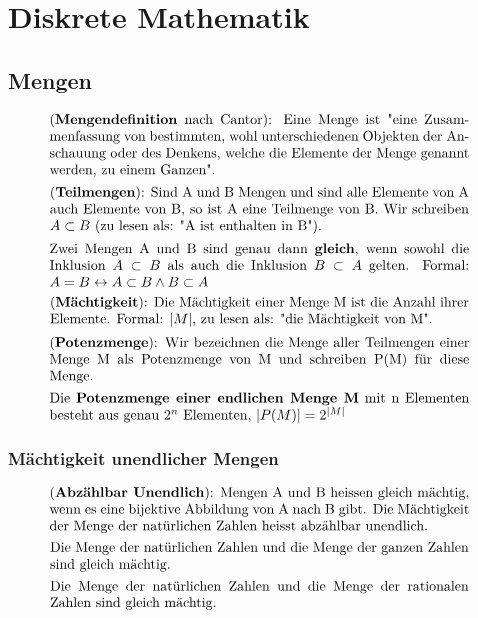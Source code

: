 \chapter{Diskrete Mathematik}
\section{Mengen}

\begin{equation}
    \parbox{30em}{(\textbf{Mengendefinition} nach Cantor): Eine Menge ist "eine Zusammenfassung von bestimmten, wohl unterschiedenen Objekten der Anschauung oder 
    des Denkens, welche die Elemente der Menge genannt werden, zu einem Ganzen".}
\end{equation}
\begin{equation}
    \parbox{30em}{(\textbf{Teilmengen}): Sind A und B Mengen und sind alle Elemente von A
    auch Elemente von B, so ist A eine Teilmenge von B. Wir schreiben \( A \subset B \) (zu 
    lesen als: "A ist enthalten in B").}
\end{equation}
\begin{equation}
    \parbox{30em}{Zwei Mengen A und B sind genau dann \textbf{gleich}, wenn sowohl die Inklusion 
    \(A \subset B\) als auch die Inklusion \( B \subset A\) gelten. 
    Formal: \(A = B \leftrightarrow A \subset B \land B \subset A\)}
\end{equation}
\begin{equation}
    \parbox{30em}{(\textbf{Mächtigkeit}): Die Mächtigkeit einer Menge M ist die Anzahl ihrer 
    Elemente. Formal: \(|M|\), zu lesen als: "die Mächtigkeit von M".}
\end{equation}
\begin{equation}
    \parbox{30em}{(\textbf{Potenzmenge}): Wir bezeichnen die Menge aller Teilmengen einer 
    Menge M als Potenzmenge von M und schreiben P(M) für diese Menge.}
\end{equation}
\begin{equation}
    \parbox{30em}{Die \textbf{Potenzmenge einer endlichen Menge M} mit n Elementen besteht aus 
    genau \(2^n\) Elementen, \(|P(M)|=2^{|M|}\)}
\end{equation}
\subsection{Mächtigkeit unendlicher Mengen}
\begin{equation}
    \parbox{30em}{(\textbf{Abzählbar Unendlich}): Mengen A und B heissen gleich mächtig, wenn es eine bijektive Abbildung von A nach B gibt. Die Mächtigkeit der Menge der natürlichen 
    Zahlen heisst abzählbar unendlich.}
\end{equation}
\begin{equation}
    \parbox{30em}{Die Menge der natürlichen Zahlen und die Menge der ganzen Zahlen sind 
    gleich mächtig.}
\end{equation}
\begin{equation}
    \parbox{30em}{Die Menge der natürlichen Zahlen und die Menge der rationalen Zahlen 
    sind gleich mächtig.}
\end{equation}
